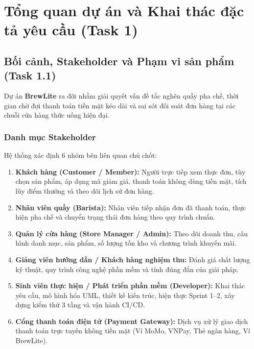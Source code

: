 \documentclass[a4paper,12pt]{article}
\begin{document}
\tableofcontents
\newpage

\section{Tổng quan dự án và Khai thác đặc tả yêu cầu (Task 1)}

\subsection{Bối cảnh, Stakeholder và Phạm vi sản phẩm (Task 1.1)}
Dự án \textbf{BrewLite} ra đời nhằm giải quyết vấn đề tắc nghẽn quầy pha chế, thời gian chờ đợi thanh toán tiền mặt kéo dài và sai sót đối soát đơn hàng tại các chuỗi cửa hàng thức uống hiện đại.

\subsubsection{Danh mục Stakeholder}
Hệ thống xác định 6 nhóm bên liên quan chủ chốt:
\begin{enumerate}[1.]
  \item \textbf{Khách hàng (Customer / Member):} Người trực tiếp xem thực đơn, tùy chọn sản phẩm, áp dụng mã giảm giá, thanh toán không dùng tiền mặt, tích lũy điểm thưởng và theo dõi lịch sử đơn hàng.
  \item \textbf{Nhân viên quầy (Barista):} Nhân viên tiếp nhận đơn đã thanh toán, thực hiện pha chế và chuyển trạng thái đơn hàng theo quy trình chuẩn.
  \item \textbf{Quản lý cửa hàng (Store Manager / Admin):} Theo dõi doanh thu, cấu hình danh mục, sản phẩm, số lượng tồn kho và chương trình khuyến mãi.
  \item \textbf{Giảng viên hướng dẫn / Khách hàng nghiệm thu:} Đánh giá chất lượng kỹ thuật, quy trình công nghệ phần mềm và tính đúng đắn của giải pháp.
  \item \textbf{Sinh viên thực hiện / Phát triển phần mềm (Developer):} Khai thác yêu cầu, mô hình hóa UML, thiết kế kiến trúc, hiện thực Sprint 1--2, xây dựng kiểm thử 3 tầng và vận hành CI/CD.
  \item \textbf{Cổng thanh toán điện tử (Payment Gateway):} Dịch vụ xử lý giao dịch thanh toán trực tuyến không tiền mặt (Ví MoMo, VNPay, Thẻ ngân hàng, Ví BrewLite).
\end{enumerate}
\end{document}
